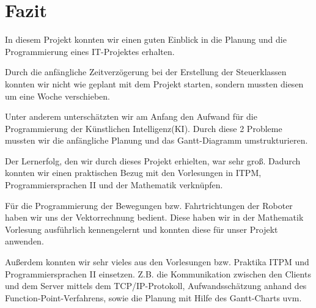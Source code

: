 \section{Fazit}
In diesem Projekt konnten wir einen guten Einblick in die Planung und die Programmierung eines IT-Projektes erhalten.

Durch die anfängliche Zeitverzögerung bei der Erstellung der Steuerklassen konnten wir nicht wie geplant mit dem Projekt starten, sondern mussten diesen um eine Woche verschieben.

Unter anderem unterschätzten wir am Anfang den Aufwand für die Programmierung der Künstlichen Intelligenz(KI).
Durch diese 2 Probleme mussten wir die anfängliche Planung und das Gantt-Diagramm umstrukturieren.

Der Lernerfolg, den wir durch dieses Projekt erhielten, war sehr groß. Dadurch konnten wir einen praktischen Bezug mit den Vorlesungen in ITPM, Programmiersprachen II und der Mathematik verknüpfen.

Für die Programmierung der Bewegungen bzw. Fahrtrichtungen der Roboter haben wir uns der Vektorrechnung bedient. Diese haben wir in der Mathematik Vorlesung ausführlich kennengelernt und konnten diese für unser Projekt anwenden.

Außerdem konnten wir sehr vieles aus den Vorlesungen bzw. Praktika ITPM und Programmiersprachen II einsetzen.
Z.B. die Kommunikation zwischen den Clients und dem Server mittels dem TCP/IP-Protokoll, Aufwandsschätzung anhand des Function-Point-Verfahrens, sowie die Planung mit Hilfe des Gantt-Charts uvm.
\newpage